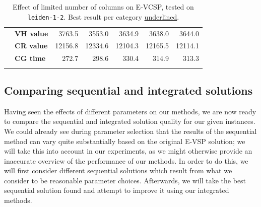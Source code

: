\documentclass[]{article}
\begin{document}
\begin{table}[h]
\begin{tabular}{llrrrrr}
    & \textbf{VH value} & 3763.5 & 3553.0 & 3634.9 & 3638.0 & 3644.0 \\
    & \textbf{CR value} & 12156.8 & 12334.6 & 12104.3 & 12165.5 & 12114.1 \\
    & \textbf{CG time} & 272.7 & 298.6 & 330.4 & 314.9 & 313.3 \\
    \arrayrulecolor{black}\bottomrule
  \end{tabular}
  \caption{Effect of limited number of columns on E-VCSP, tested on \texttt{leiden-1-2}. Best result per category \underline{underlined}.}
  \label{tab:evcsp-max-cols}
\end{table}

\subsection{Comparing sequential and integrated solutions}
Having seen the effects of different parameters on our methods, we are now ready to compare the sequential and integrated solution quality for our given instances. We could already see during parameter selection that the results of the sequential method can vary quite substantially based on the original E-VSP solution; we will take this into account in our experiments, as we might otherwise provide an inaccurate overview of the performance of our methods. In order to do this, we will first consider different sequential solutions which result from what we consider to be reasonable parameter choices. Afterwards, we will take the best sequential solution found and attempt to improve it using our integrated methods. 
\end{document}
